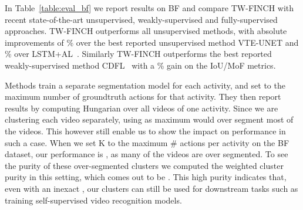 \documentclass[10pt,twocolumn,letterpaper]{article}
\begin{document}
In Table~\ref{table:eval_bf} we report results on BF and compare TW-FINCH with recent state-of-the-art unsupervised, weakly-supervised and fully-supervised approaches. TW-FINCH outperforms all unsupervised methods, with absolute improvements of
\% over the best reported unsupervised method VTE-UNET and \% over LSTM+AL~\cite{lstm_al}. Similarly TW-FINCH outperforms the best reported weakly-supervised method CDFL~\cite{cdfl} with a \% gain on the IoU/MoF metrics.

Methods \cite{ute_paper, mallow} train a separate segmentation model for each activity, and set  to the maximum number of groundtruth actions for that activity. They then report results by computing Hungarian over all videos of one activity. Since we are clustering each video separately, using  as maximum would over segment most of the videos. This however still enable us to show the impact on performance in such a case.
When we set K to the maximum \# actions per activity on the BF dataset, our performance is , as many of the videos are over segmented. 
To see the purity of these over-segmented clusters we computed the weighted cluster purity in this setting, which comes out to be .
This high purity indicates that, even with an inexact , our clusters can still be used for downstream tasks such as training self-supervised video recognition models.

\begin{table}[t!]
\centering
{}
\caption{Comparison on the Inria Instructional Videos~\cite{yti_paper} dataset. * denotes results with Hungarian computed over all videos of an activity together.
\label{table:eval_yti}}
\end{table}
\end{document}
